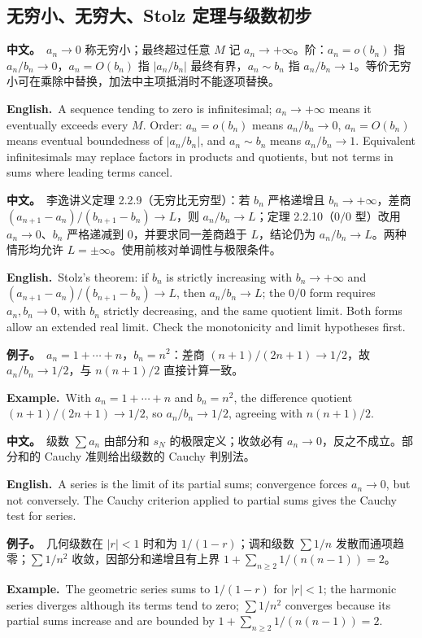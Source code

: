 \documentclass[UTF8,11pt,a4paper]{ctexart}
\newcommand{\BOTH}[2]{\par\noindent\textbf{中文。}\ #1\par\noindent\textbf{English.}\ #2\par}
\newcommand{\EX}[2]{\par\noindent\textbf{例子。}\ #1\par\noindent\textbf{Example.}\ #2\par}
\begin{document}
\subsection{无穷小、无穷大、Stolz 定理与级数初步}
\BOTH{$a_n\to0$ 称无穷小；最终超过任意 $M$ 记 $a_n\to+\infty$。阶：$a_n=o(b_n)$ 指 $a_n/b_n\to0$，$a_n=O(b_n)$ 指 $|a_n/b_n|$ 最终有界，$a_n\sim b_n$ 指 $a_n/b_n\to1$。等价无穷小可在乘除中替换，加法中主项抵消时不能逐项替换。}{A sequence tending to zero is infinitesimal; $a_n\to+\infty$ means it eventually exceeds every $M$. Order: $a_n=o(b_n)$ means $a_n/b_n\to0$, $a_n=O(b_n)$ means eventual boundedness of $|a_n/b_n|$, and $a_n\sim b_n$ means $a_n/b_n\to1$. Equivalent infinitesimals may replace factors in products and quotients, but not terms in sums where leading terms cancel.}
\BOTH{李逸讲义定理 2.2.9（无穷比无穷型）：若 $b_n$ 严格递增且 $b_n\to+\infty$，差商 $(a_{n+1}-a_n)/(b_{n+1}-b_n)\to L$，则 $a_n/b_n\to L$；定理 2.2.10（$0/0$ 型）改用 $a_n\to0$、$b_n$ 严格递减到 $0$，并要求同一差商趋于 $L$，结论仍为 $a_n/b_n\to L$。两种情形均允许 $L=\pm\infty$。使用前核对单调性与极限条件。}{Stolz's theorem: if $b_n$ is strictly increasing with $b_n\to+\infty$ and $(a_{n+1}-a_n)/(b_{n+1}-b_n)\to L$, then $a_n/b_n\to L$; the $0/0$ form requires $a_n,b_n\to0$, with $b_n$ strictly decreasing, and the same quotient limit. Both forms allow an extended real limit. Check the monotonicity and limit hypotheses first.}
\EX{$a_n=1+\cdots+n$，$b_n=n^2$：差商 $(n+1)/(2n+1)\to1/2$，故 $a_n/b_n\to1/2$，与 $n(n+1)/2$ 直接计算一致。}{With $a_n=1+\cdots+n$ and $b_n=n^2$, the difference quotient $(n+1)/(2n+1)\to1/2$, so $a_n/b_n\to1/2$, agreeing with $n(n+1)/2$.}
\BOTH{级数 $\sum a_n$ 由部分和 $s_N$ 的极限定义；收敛必有 $a_n\to0$，反之不成立。部分和的 Cauchy 准则给出级数的 Cauchy 判别法。}{A series is the limit of its partial sums; convergence forces $a_n\to0$, but not conversely. The Cauchy criterion applied to partial sums gives the Cauchy test for series.}
\EX{几何级数在 $|r|<1$ 时和为 $1/(1-r)$；调和级数 $\sum1/n$ 发散而通项趋零；$\sum1/n^2$ 收敛，因部分和递增且有上界 $1+\sum_{n\ge2}1/(n(n-1))=2$。}{The geometric series sums to $1/(1-r)$ for $|r|<1$; the harmonic series diverges although its terms tend to zero; $\sum1/n^2$ converges because its partial sums increase and are bounded by $1+\sum_{n\ge2}1/(n(n-1))=2$.}
\end{document}
